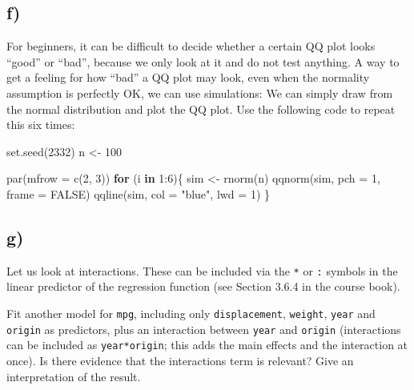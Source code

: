 \documentclass[
]{article}
\newenvironment{Shaded}{\begin{snugshade}}{\end{snugshade}}
\newcommand{\AttributeTok}[1]{\textcolor[rgb]{0.77,0.63,0.00}{#1}}
\newcommand{\ConstantTok}[1]{\textcolor[rgb]{0.00,0.00,0.00}{#1}}
\newcommand{\ControlFlowTok}[1]{\textcolor[rgb]{0.13,0.29,0.53}{\textbf{#1}}}
\newcommand{\DecValTok}[1]{\textcolor[rgb]{0.00,0.00,0.81}{#1}}
\newcommand{\FunctionTok}[1]{\textcolor[rgb]{0.00,0.00,0.00}{#1}}
\newcommand{\NormalTok}[1]{#1}
\newcommand{\OtherTok}[1]{\textcolor[rgb]{0.56,0.35,0.01}{#1}}
\newcommand{\SpecialCharTok}[1]{\textcolor[rgb]{0.00,0.00,0.00}{#1}}
\newcommand{\StringTok}[1]{\textcolor[rgb]{0.31,0.60,0.02}{#1}}
\begin{document}
\hypertarget{f}{%
\subsection{f)}\label{f}}

For beginners, it can be difficult to decide whether a certain QQ plot
looks ``good'' or ``bad'', because we only look at it and do not test
anything. A way to get a feeling for how ``bad'' a QQ plot may look,
even when the normality assumption is perfectly OK, we can use
simulations: We can simply draw from the normal distribution and plot
the QQ plot. Use the following code to repeat this six times:

\begin{Shaded}
\begin{Highlighting}[]
\FunctionTok{set.seed}\NormalTok{(}\DecValTok{2332}\NormalTok{)}
\NormalTok{n }\OtherTok{\textless{}{-}} \DecValTok{100}

\FunctionTok{par}\NormalTok{(}\AttributeTok{mfrow =} \FunctionTok{c}\NormalTok{(}\DecValTok{2}\NormalTok{, }\DecValTok{3}\NormalTok{))}
\ControlFlowTok{for}\NormalTok{ (i }\ControlFlowTok{in} \DecValTok{1}\SpecialCharTok{:}\DecValTok{6}\NormalTok{)\{}
\NormalTok{  sim }\OtherTok{\textless{}{-}} \FunctionTok{rnorm}\NormalTok{(n)}
  \FunctionTok{qqnorm}\NormalTok{(sim, }\AttributeTok{pch =} \DecValTok{1}\NormalTok{, }\AttributeTok{frame =} \ConstantTok{FALSE}\NormalTok{)}
  \FunctionTok{qqline}\NormalTok{(sim, }\AttributeTok{col =} \StringTok{"blue"}\NormalTok{, }\AttributeTok{lwd =} \DecValTok{1}\NormalTok{)}
\NormalTok{\}}
\end{Highlighting}
\end{Shaded}

\hypertarget{g}{%
\subsection{g)}\label{g}}

Let us look at interactions. These can be included via the \texttt{*} or
\texttt{:} symbols in the linear predictor of the regression function
(see Section 3.6.4 in the course book).

Fit another model for \texttt{mpg}, including only
\texttt{displacement}, \texttt{weight}, \texttt{year} and
\texttt{origin} as predictors, plus an interaction between \texttt{year}
and \texttt{origin} (interactions can be included as
\texttt{year*origin}; this adds the main effects and the interaction at
once). Is there evidence that the interactions term is relevant? Give an
interpretation of the result.
\end{document}
